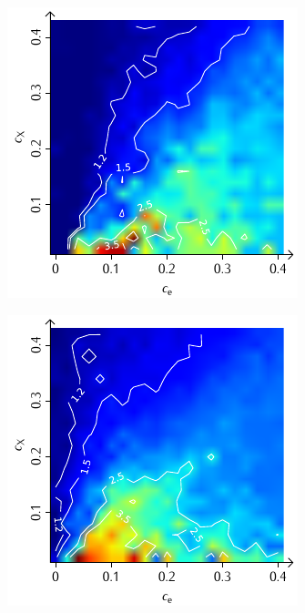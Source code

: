 \documentclass[a4paper, 10pt, twoside, openany]{book} %
\begin{document}
	\begin{figure}
		\begin{minipage}[t]{0.48\textwidth}
			\includegraphics[width=\textwidth]{Abbildungen/Phasendiagramme/Konturen/F_cluster_D.pdf}
			\label{F_cluster_D}
		\end{minipage}
		\hfill
		\begin{minipage}[t]{0.48\textwidth}
			\includegraphics[width=\textwidth]{Abbildungen/Phasendiagramme/Konturen/F_penalty_cluster_D.pdf}

\end{minipage}
\end{figure}
\end{document}
